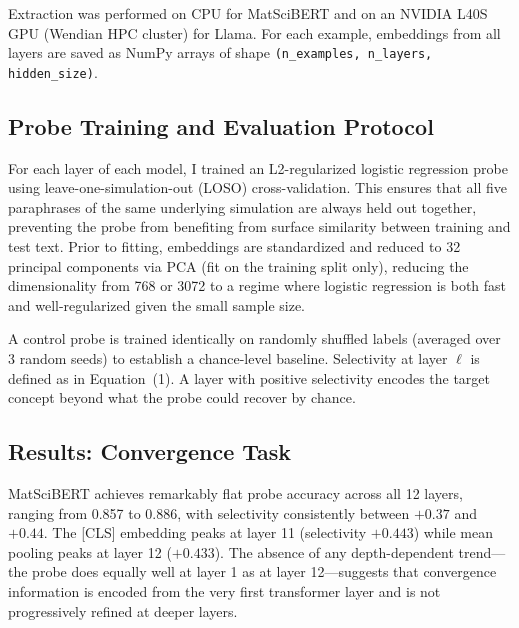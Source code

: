 \documentclass[11pt]{article}
\begin{document}
Extraction was performed on CPU for MatSciBERT and on an NVIDIA L40S GPU (Wendian HPC cluster) for Llama. For each example, embeddings from all layers are saved as NumPy arrays of shape \texttt{(n\_examples, n\_layers, hidden\_size)}.

\subsection{Probe Training and Evaluation Protocol}

For each layer of each model, I trained an L2-regularized logistic regression probe using leave-one-simulation-out (LOSO) cross-validation. This ensures that all five paraphrases of the same underlying simulation are always held out together, preventing the probe from benefiting from surface similarity between training and test text. Prior to fitting, embeddings are standardized and reduced to 32 principal components via PCA (fit on the training split only), reducing the dimensionality from 768 or 3072 to a regime where logistic regression is both fast and well-regularized given the small sample size.

A control probe is trained identically on randomly shuffled labels (averaged over 3 random seeds) to establish a chance-level baseline. Selectivity at layer $\ell$ is defined as in Equation~(1). A layer with positive selectivity encodes the target concept beyond what the probe could recover by chance.

\subsection{Results: Convergence Task}


MatSciBERT achieves remarkably flat probe accuracy across all 12 layers, ranging from 0.857 to 0.886, with selectivity consistently between $+0.37$ and $+0.44$. The [CLS] embedding peaks at layer 11 (selectivity $+0.443$) while mean pooling peaks at layer 12 ($+0.433$). The absence of any depth-dependent trend---the probe does equally well at layer 1 as at layer 12---suggests that convergence information is encoded from the very first transformer layer and is not progressively refined at deeper layers.
\end{document}
